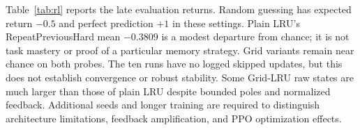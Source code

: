\documentclass[letterpaper,twoside]{article}
\begin{document}


Table~\ref{tab:rl} reports the late evaluation returns. Random guessing has expected return $-0.5$ and perfect prediction $+1$ in these settings. Plain LRU's RepeatPreviousHard mean $-0.3809$ is a modest departure from chance; it is not task mastery or proof of a particular memory strategy. Grid variants remain near chance on both probes. The ten runs have no logged skipped updates, but this does not establish convergence or robust stability. Some Grid-LRU raw states are much larger than those of plain LRU despite bounded poles and normalized feedback. Additional seeds and longer training are required to distinguish architecture limitations, feedback amplification, and PPO optimization effects.

\clearpage

\end{document}
